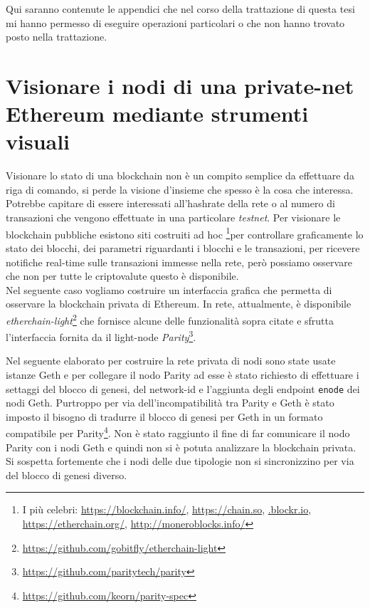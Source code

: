 \begin{appendices}
	Qui saranno contenute le appendici che nel corso della trattazione di questa tesi mi hanno permesso di eseguire operazioni particolari o che non hanno trovato posto nella trattazione.
	
	
	\section{Visionare i nodi di una private-net Ethereum mediante strumenti visuali}\label{appendice:a}
	
	Visionare lo stato di una blockchain non è un compito semplice da effettuare da riga di comando, si perde la visione d'insieme che spesso è la cosa che interessa. Potrebbe capitare di essere interessati all'hashrate della rete o al numero di transazioni che vengono effettuate in una particolare \textit{testnet}. Per visionare le blockchain pubbliche esistono siti costruiti ad hoc \footnote{I più celebri: \url{https://blockchain.info/}, \url{https://chain.so}, \url{.blockr.io},  \url{https://etherchain.org/}, \url{http://moneroblocks.info/}}per controllare graficamente lo stato dei blocchi, dei parametri riguardanti i blocchi e le transazioni, per ricevere notifiche real-time sulle transazioni immesse nella rete, però possiamo osservare che non per tutte le criptovalute questo è disponibile.\\
	Nel seguente caso vogliamo costruire un interfaccia grafica che permetta di osservare la blockchain privata di Ethereum.
	In rete, attualmente, è disponibile \textit{etherchain-light}\footnote{\url{https://github.com/gobitfly/etherchain-light}} che fornisce alcune delle funzionalità sopra citate e sfrutta l'interfaccia fornita da il light-node \textit{Parity}\footnote{\url{https://github.com/paritytech/parity}}.
	
	Nel seguente elaborato per costruire la rete privata di nodi sono state usate istanze Geth e per collegare il nodo Parity ad esse è stato richiesto di effettuare i settaggi del blocco di genesi, del network-id e l'aggiunta degli endpoint \lstinline|enode| dei nodi Geth. 
	Purtroppo per via dell'incompatibilità tra Parity e Geth è stato imposto il bisogno di tradurre il blocco di genesi per Geth in un formato compatibile per Parity\footnote{\url{https://github.com/keorn/parity-spec}}. Non è stato raggiunto il fine di far comunicare il nodo Parity con i nodi Geth e quindi non si è potuta analizzare la blockchain privata. Si sospetta fortemente che i nodi delle due tipologie non si sincronizzino per via del blocco di genesi diverso.\\
	

\end{appendices}
